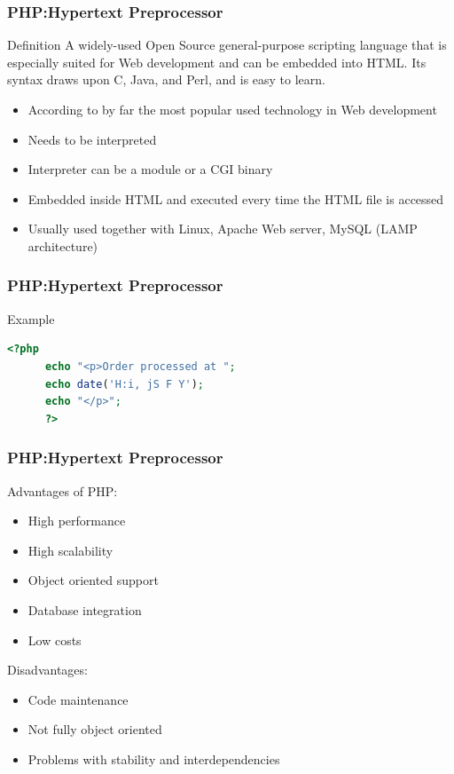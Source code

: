 \documentclass[9pt]{beamer}
\begin{document}
\begin{frame}
\frametitle<presentation>{PHP:Hypertext Preprocessor}
  \begin{block}{Definition \cite{PHPPreface}}
  A widely-used Open Source general-purpose scripting language that is especially suited for Web development and can be embedded into HTML. Its
  syntax draws upon C, Java, and Perl, and is easy to learn.
  \end{block}
  
  \begin{itemize}
  \item According to \cite{w3TechsStats} by far the most popular used technology in Web development
  \item Needs to be interpreted
  \item Interpreter can be a module or a CGI binary
  \item Embedded inside HTML and executed every time the HTML file is accessed
  \item Usually used together with Linux, Apache Web server, MySQL (LAMP architecture)
  \end{itemize}
  
\end{frame}

\begin{frame}[fragile]
\frametitle<presentation>{PHP:Hypertext Preprocessor}

  \begin{exampleblock}{Example}
    \begin{lstlisting}[language=php, captionpos=b,caption={PHP embedded in HTML. Taken from \cite{welling2008php}},label=lst:php]
      <?php
      echo "<p>Order processed at ";
      echo date('H:i, jS F Y');
      echo "</p>";
      ?>
    \end{lstlisting}
  \end{exampleblock}
\end{frame}

\begin{frame}
\frametitle<presentation>{PHP:Hypertext Preprocessor}

  \begin{multicols}{2}
    Advantages of PHP:
    \begin{itemize}
    \item High performance
    \item High scalability
    \item Object oriented support
    \item Database integration
    \item Low costs
    \end{itemize}
    
    Disadvantages:
    \begin{itemize}
      \item Code maintenance 
      \item Not fully object oriented
      \item Problems with stability and interdependencies
    \end{itemize}
  \end{multicols}

\end{frame}
\end{document}
